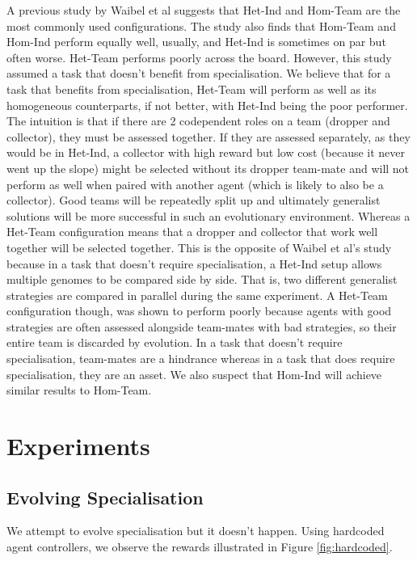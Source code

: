 \documentclass[12pt]{article}  %
\begin{document}
A previous study by Waibel et al suggests that Het-Ind and Hom-Team are the most commonly used configurations.
The study also finds that Hom-Team and Hom-Ind perform equally well, usually, and Het-Ind is sometimes on par but often worse. 
Het-Team performs poorly across the board.
However, this study assumed a task that doesn’t benefit from specialisation. 
We believe that for a task that benefits from specialisation, Het-Team will perform as well as its homogeneous counterparts, if not better, with Het-Ind being the poor performer.
The intuition is that if there are 2 codependent roles on a team (dropper and collector), they must be assessed together. 
If they are assessed separately, as they would be in Het-Ind, a collector with high reward but low cost (because it never went up the slope) might be selected without its dropper team-mate and will not perform as well when paired with another agent (which is likely to also be a collector).
Good teams will be repeatedly split up and ultimately generalist solutions will be more successful in such an evolutionary environment.
Whereas a Het-Team configuration means that a dropper and collector that work well together will be selected together.
This is the opposite of Waibel et al's study because in a task that doesn't require specialisation, a Het-Ind setup allows multiple genomes to be compared side by side.
That is, two different generalist strategies are compared in parallel during the same experiment.
A Het-Team configuration though, was shown to perform poorly because agents with good strategies are often assessed alongside team-mates with bad strategies, so their entire team is discarded by evolution.
In a task that doesn't require specialisation, team-mates are a hindrance whereas in a task that does require specialisation, they are an asset.
We also suspect that Hom-Ind will achieve similar results to Hom-Team.

\section{Experiments}

\subsection{Evolving Specialisation}
We attempt to evolve specialisation but it doesn't happen.
Using hardcoded agent controllers, we observe the rewards illustrated in Figure \ref{fig:hardcoded}. \\
\end{document}
